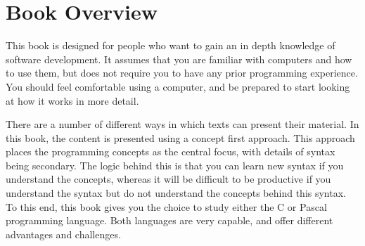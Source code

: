 \section*{Book Overview} %
\label{sub:book_overview}

This book is designed for people who want to gain an in depth knowledge of software development. It assumes that you are familiar with computers and how to use them, but does not require you to have any prior programming experience. You should feel comfortable using a computer, and be prepared to start looking at how it works in more detail.

There are a number of different ways in which texts can present their material. In this book, the content is presented using a concept first approach. This approach places the programming concepts as the central focus, with details of syntax being secondary. The logic behind this is that you can learn new syntax if you understand the concepts, whereas it will be difficult to be productive if you understand the syntax but do not understand the concepts behind this syntax. To this end, this book gives you the choice to study either the C or Pascal programming language. Both languages are very capable, and offer different advantages and challenges.

